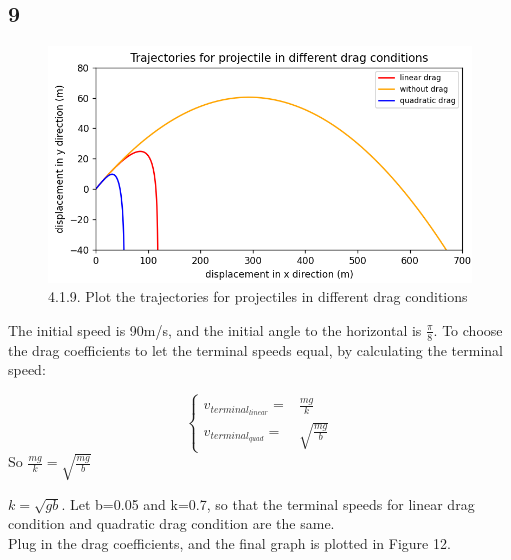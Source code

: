 \documentclass{article}
\begin{document}
\subsection*{9}
\begin{figure}[H]
  \centering
  \includegraphics[scale=0.4]{./graphs/project4.1.9.png}
  \caption{4.1.9. Plot the trajectories for projectiles in different drag conditions}
\end{figure}
The initial speed is 90m/s, and the initial angle to the horizontal is {$\frac{\pi}{8}$}.
To choose the drag coefficients to let the terminal speeds equal, by calculating the terminal speed:

$$
  \begin{cases}
    v_{terminal_{linear}}= & \frac{mg}{k}        \\

    v_{terminal_{quad}}=   & \sqrt{\frac{mg}{b}}
  \end{cases}
$$
So $\frac{mg}{k}=\sqrt{\frac{mg}{b}}$

$k=\sqrt{gb}$. Let b=0.05 and k=0.7, so that the terminal speeds for linear drag condition and quadratic drag condition are the same. \\

Plug in the drag coefficients, and the final graph is plotted in Figure 12.
\end{document}

